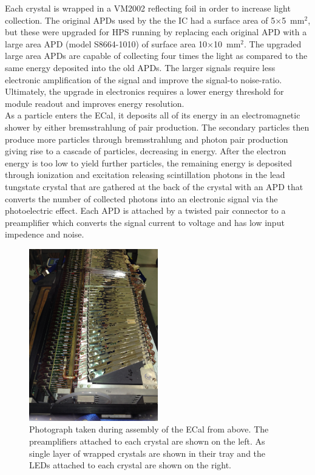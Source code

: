 Each crystal is wrapped in a VM2002 reflecting foil in order to increase light collection. The original APDs used by the the IC had a surface area of 5$\times$5~mm$^2$, but these were upgraded for HPS running by replacing each original APD with a large area APD (model S8664-1010) of surface area 10$\times$10~mm$^2$. The upgraded large area APDs are capable of collecting four times the light as compared to the same energy deposited into the old APDs. The larger signals require less electronic amplification of the signal and improve the signal-to noise-ratio. Ultimately, the upgrade in electronics requires a lower energy threshold for module readout and improves energy resolution. \\
\indent As a particle enters the ECal, it deposits all of its energy in an electromagnetic shower by either bremsstrahlung of pair production. The secondary particles then produce more particles through bremsstrahlung and photon pair production giving rise to a cascade of particles, decreasing in energy. After the electron energy is too low to yield further particles, the remaining energy is deposited through ionization and excitation releasing scintillation photons in the lead tungstate crystal that are gathered at the back of the crystal with an APD that converts the number of collected photons into an electronic signal via the photoelectric effect. Each APD is attached by a twisted pair connector to a preamplifier which converts the signal current to voltage and has low input impedence and noise.  

\begin{figure}[H]
  \centering
      \includegraphics[width=0.5\textwidth]{pics/experiment/ecalAssembly1.png}
  \caption[Photograph of ECal crystals during assembly]{Photograph taken during assembly of the ECal from above. The preamplifiers attached to each crystal are shown on the left. As single layer of wrapped crystals are shown in their tray and the LEDs attached to each crystal are shown on the right.}
  \label{Figure:ecalAssembly1}
\end{figure}


